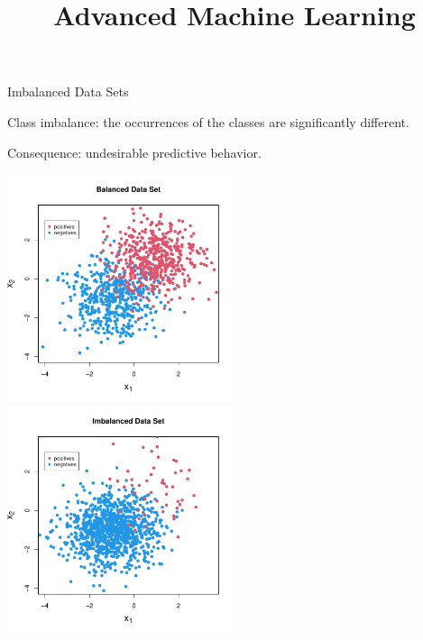 \documentclass[11pt,compress,t,notes=noshow, xcolor=table]{beamer}
\title{Advanced Machine Learning}
\date{}
\begin{document}



\sloppy

\begin{vbframe}{Imbalanced Data Sets}
%
\small{
  \begin{itemize}
%  	
	\begin{minipage}{0.45\textwidth}
%		    
		    \item Class imbalance: the occurrences of the classes are significantly different. 
%		     
		    \item Consequence: undesirable predictive behavior.
	\end{minipage}
	\begin{minipage}{0.45\textwidth}    
		\begin{center}
			\includegraphics[width=0.5\textwidth]{figure_man/balanced_data_plot}
			\includegraphics[width=0.5\textwidth]{figure_man/imbalanced_data_plot}
		\end{center}
	\end{minipage}

%

  \end{itemize}}
%
\end{vbframe}
\end{document}
